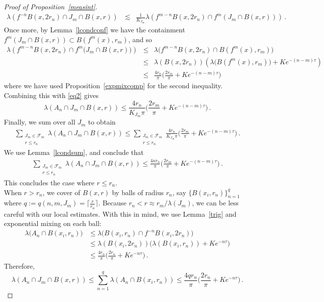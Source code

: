 \documentclass[10pt,a4paper]{amsart}
\begin{document}
\begin{proof}[Proof of Proposition~\ref{measint}]
\begin{align}\label{eq2}
   \lambda\left(f^{-n}B(x,2r_n) \cap J_m \cap B(x,r)\right) \: & \lesssim & \frac{1}{K_{J_m}}  \lambda\left(f^{m-n}B(x,2r_n)  \cap f^m(J_m \cap B(x,r))\right) \, .  
\end{align}  
Once more, by Lemma~\ref{lcondconf} we have the containment $f^m (J_m \cap B(x,r)) \subset B(f^m(x),r_m)$, and so 
\begin{eqnarray*}
    \lambda\left(f^{m-n}B(x,2r_n)  \cap f^m\big(J_m \cap B(x,r)\big)\right) &\leq& \lambda\big(f^{m-n}B(x,2r_n)  \cap B(f^m(x),r_m)\big) 
    \\[2ex]& \leq & \lambda(B(x,2r_n))\left(\lambda\big(B(f^m(x),r_m)\big)+ Ke^{-(n-m)\tau} \right)
    \\[2ex] & \leq & \frac{4r_n}{\pi} \big(\frac{2r_m}{\pi} + Ke^{-(n-m)\tau} \big)
\end{eqnarray*}
where we have used Proposition~\ref{expmixcomp} for the second inequality. Combining this with \eqref{eq2} gives 
$$
\lambda(A_n \cap J_m \cap B(x,r)) \leq  \frac{4r_n}{K_{J_m}\pi} \big(\frac{2r_m}{\pi} + Ke^{-(n-m)\tau} \big) \, .
$$
Finally, we sum over all $J_m$ to obtain 
\begin{align}\label{sum0}
    \sum\limits_{\substack{J_m \in \mathcal{F}_m  \\ r \leq r_n}} \lambda(A_n \cap J_m \cap B(x,r)) \leq \sum\limits_{\substack{J_m \in \mathcal{F}_m  \\ r \leq r_n}} \frac{4r_n}{K_{J_m}\pi} \big(\frac{2r_m}{\pi} + Ke^{-(n-m)\tau} \big) \, .
\end{align}
 We use Lemma~\ref{lcondsum}, and conclude that
\begin{align}\label{sum1}
    \sum\limits_{\substack{J_m \in \mathcal{F}_m  \\ r \leq r_n}} \lambda(A_n \cap J_m \cap B(x,r)) \leq \frac{4\kappa r_n}{\pi}\big(\frac{2r_m}{\pi}+Ke^{-(n-m)\tau}\big) \, .
\end{align}
This concludes the case where $r \leq r_n$. 
\\
When $r > r_n$, we cover of $B(x,r)$ by balls of radius $r_n$, say $\{B(x_i,r_n)\}_{n=1}^{q}$ where $q:=q(n,m, J_m)=\lceil \frac{r}{r_n} \rceil $. Because $r_n<r \approx r_m/\lambda(J_m)$, we can be less careful with our local estimates. With this in mind, we use Lemma~\ref{trig} and exponential mixing on each ball: 
\begin{align*}
    \lambda\big(A_n \cap B(x_i,r_n) \big) & \leq  \lambda\big(B(x_i,r_n) \cap f^{-n}B(x_i,2r_n)\big) \\[1ex] & \leq \lambda(B(x_i,2r_n)) \big(\lambda(B(x_i,r_n))+ Ke^{-n\tau} \big) \\[1ex] & \leq \frac{4r_n}{\pi}\big(\frac{2r_n}{\pi}+ Ke^{-n\tau} \big) \, .
\end{align*}
Therefore, 
$$
\lambda(A_n \cap J_m \cap B(x,r)) \leq \sum\limits_{n=1}^{q}\lambda(A_n \cap B(x_i,r_n)) \leq \frac{4qr_n}{\pi}\big(\frac{2r_n}{\pi}+ Ke^{-n\tau} \big) \, .
$$


\end{proof}
\end{document}
